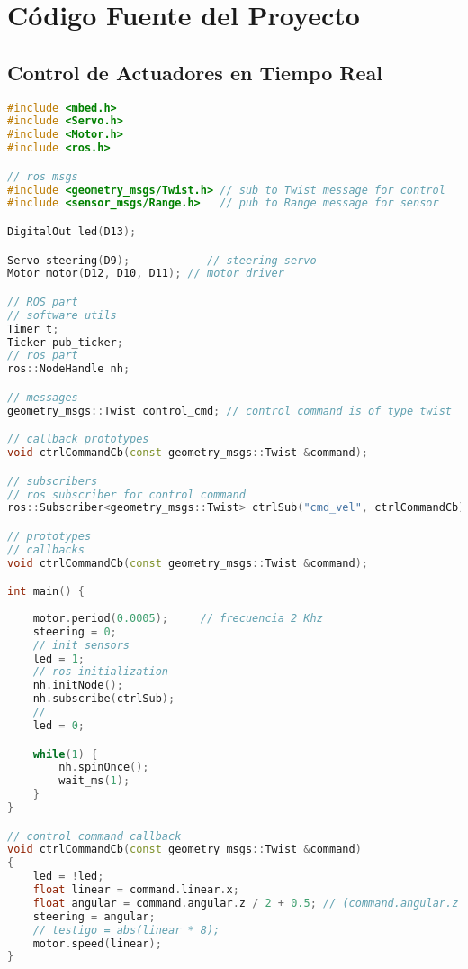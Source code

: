 \chapter{Código Fuente del Proyecto}\label{apx:source}
\section{Control de Actuadores en Tiempo Real}
\begin{lstlisting}[title={main.cpp},language=c++]
#include <mbed.h>
#include <Servo.h>
#include <Motor.h>
#include <ros.h>

// ros msgs
#include <geometry_msgs/Twist.h> // sub to Twist message for control
#include <sensor_msgs/Range.h>   // pub to Range message for sensor

DigitalOut led(D13);

Servo steering(D9);            // steering servo
Motor motor(D12, D10, D11); // motor driver

// ROS part
// software utils
Timer t;
Ticker pub_ticker;
// ros part
ros::NodeHandle nh;

// messages
geometry_msgs::Twist control_cmd; // control command is of type twist

// callback prototypes
void ctrlCommandCb(const geometry_msgs::Twist &command);

// subscribers
// ros subscriber for control command
ros::Subscriber<geometry_msgs::Twist> ctrlSub("cmd_vel", ctrlCommandCb);

// prototypes 
// callbacks
void ctrlCommandCb(const geometry_msgs::Twist &command);

int main() {
    
    motor.period(0.0005);     // frecuencia 2 Khz
    steering = 0;
    // init sensors
    led = 1;
    // ros initialization
    nh.initNode();
    nh.subscribe(ctrlSub);
    //
    led = 0;

    while(1) {
        nh.spinOnce();
        wait_ms(1);
    }
}

// control command callback
void ctrlCommandCb(const geometry_msgs::Twist &command)
{
    led = !led;
    float linear = command.linear.x;
    float angular = command.angular.z / 2 + 0.5; // (command.angular.z * 0.35) + 0.32;
    steering = angular;
    // testigo = abs(linear * 8);
    motor.speed(linear);
}
\end{lstlisting}

